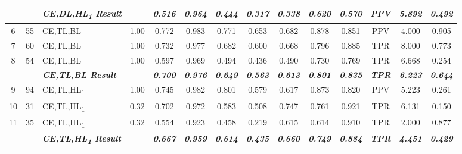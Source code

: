 \begin{table}[H]
{\begin{tabular}{cc|l|c|c|c|c|c|c|c|c|c|c|c|}
   &
     &
    \textit{\textbf{CE,DL,HL\textsubscript{1} Result}} &
     &
    \textit{\textbf{0.516}} &
    \textit{\textbf{0.964}} &
    \textit{\textbf{0.444}} &
    \textit{\textbf{0.317}} &
    \textit{\textbf{0.338}} &
    \textit{\textbf{0.620}} &
    \textit{\textbf{0.570}} &
    \textit{\textbf{PPV}} &
    \textit{\textbf{5.892}} &
    \textit{\textbf{0.492}} \\ \hline
  \multicolumn{1}{|c|}{6} &
    55 &
    CE,TL,BL &
    1.00 &
    0.772 &
    0.983 &
    0.771 &
    0.653 &
    0.682 &
    0.878 &
    0.851 &
    PPV &
    4.000 &
    0.905 \\ \hline
  \multicolumn{1}{|c|}{7} &
    60 &
    CE,TL,BL &
    1.00 &
    0.732 &
    0.977 &
    0.682 &
    0.600 &
    0.668 &
    0.796 &
    0.885 &
    TPR &
    8.000 &
    0.773 \\ \hline
  \multicolumn{1}{|c|}{8} &
    54 &
    CE,TL,BL &
    1.00 &
    0.597 &
    0.969 &
    0.494 &
    0.436 &
    0.490 &
    0.730 &
    0.769 &
    TPR &
    6.668 &
    0.254 \\ \hline
   &
     &
    \textit{\textbf{CE,TL,BL Result}} &
     &
    \textit{\textbf{0.700}} &
    \textit{\textbf{0.976}} &
    \textit{\textbf{0.649}} &
    \textit{\textbf{0.563}} &
    \textit{\textbf{0.613}} &
    \textit{\textbf{0.801}} &
    \textit{\textbf{0.835}} &
    \textit{\textbf{TPR}} &
    \textit{\textbf{6.223}} &
    \textit{\textbf{0.644}} \\ \hline
  \multicolumn{1}{|c|}{9} &
    94 &
    CE,TL,HL\textsubscript{1} &
    1.00 &
    0.745 &
    0.982 &
    0.801 &
    0.579 &
    0.617 &
    0.873 &
    0.820 &
    PPV &
    5.223 &
    0.261 \\ \hline
  \multicolumn{1}{|c|}{10} &
    31 &
    CE,TL,HL\textsubscript{1} &
    0.32 &
    0.702 &
    0.972 &
    0.583 &
    0.508 &
    0.747 &
    0.761 &
    0.921 &
    TPR &
    6.131 &
    0.150 \\ \hline
  \multicolumn{1}{|c|}{11} &
    35 &
    CE,TL,HL\textsubscript{1} &
    0.32 &
    0.554 &
    0.923 &
    0.458 &
    0.219 &
    0.615 &
    0.614 &
    0.910 &
    TPR &
    2.000 &
    0.877 \\ \hline
   &
     &
    \textit{\textbf{CE,TL,HL\textsubscript{1} Result}} &
     &
    \textit{\textbf{0.667}} &
    \textit{\textbf{0.959}} &
    \textit{\textbf{0.614}} &
    \textit{\textbf{0.435}} &
    \textit{\textbf{0.660}} &
    \textit{\textbf{0.749}} &
    \textit{\textbf{0.884}} &
    \textit{\textbf{TPR}} &
    \textit{\textbf{4.451}} &
    \textit{\textbf{0.429}} \\ \hline

\end{tabular}}
\end{table}
